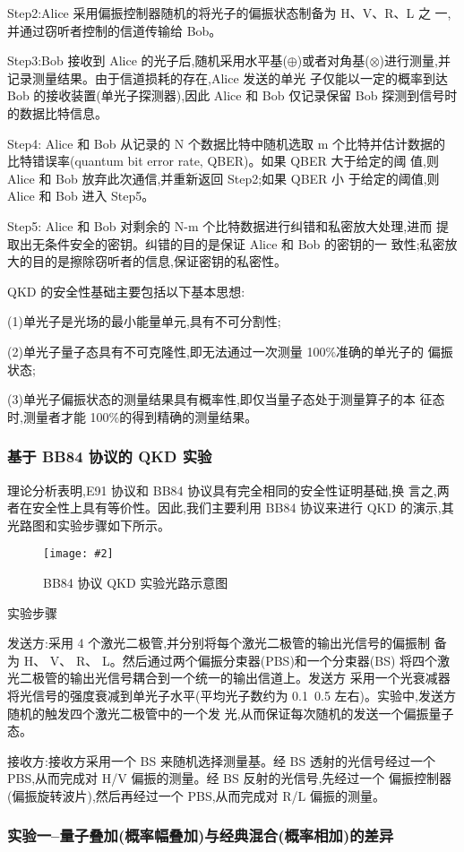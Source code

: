 \documentclass[11pt,a4paper]{ctexart}
\newcommand{\cpic}[2]{
\begin{center}
\texttt{[image: \#2]}
\end{center}
}
\newcommand{\cpicn}[3]
{
\begin{figure}[H]
\cpic{#1}{#2}
\caption{\color{red}#3\label{#2}}
\end{figure}
}
\begin{document}
Step2:Alice 采用偏振控制器随机的将光子的偏振状态制备为 H、V、R、L 之
一,并通过窃听者控制的信道传输给 Bob。

Step3:Bob 接收到 Alice 的光子后,随机采用水平基($\oplus$)或者对角基($\otimes$)进行测量,并记录测量结果。由于信道损耗的存在,Alice 发送的单光
子仅能以一定的概率到达 Bob 的接收装置(单光子探测器),因此 Alice
和 Bob 仅记录保留 Bob 探测到信号时的数据比特信息。

Step4: Alice 和 Bob 从记录的 N 个数据比特中随机选取 m 个比特并估计数据的
比特错误率(quantum bit error rate, QBER)。如果 QBER 大于给定的阈
值,则 Alice 和 Bob 放弃此次通信,并重新返回 Step2;如果 QBER 小
于给定的阈值,则 Alice 和 Bob 进入 Step5。

Step5: Alice 和 Bob 对剩余的 N-m 个比特数据进行纠错和私密放大处理,进而
提取出无条件安全的密钥。纠错的目的是保证 Alice 和 Bob 的密钥的一
致性;私密放大的目的是擦除窃听者的信息,保证密钥的私密性。

QKD 的安全性基础主要包括以下基本思想:

(1)单光子是光场的最小能量单元,具有不可分割性;

(2)单光子量子态具有不可克隆性,即无法通过一次测量 100\%准确的单光子的
偏振状态;

(3)单光子偏振状态的测量结果具有概率性,即仅当量子态处于测量算子的本
征态时,测量者才能 100\%的得到精确的测量结果。
\subsubsection{基于 BB84 协议的 QKD 实验}
理论分析表明,E91 协议和 BB84 协议具有完全相同的安全性证明基础,换
言之,两者在安全性上具有等价性。因此,我们主要利用 BB84 协议来进行 QKD
的演示,其光路图和实验步骤如下所示。
\cpicn{0.3}{BB84-optical}{BB84 协议 QKD 实验光路示意图}

实验步骤

发送方:采用 4 个激光二极管,并分别将每个激光二极管的输出光信号的偏振制
备为 H、 V、 R、 L。然后通过两个偏振分束器(PBS)和一个分束器(BS)
将四个激光二极管的输出光信号耦合到一个统一的输出信道上。发送方
采用一个光衰减器将光信号的强度衰减到单光子水平(平均光子数约为
0.1~0.5 左右)。实验中,发送方随机的触发四个激光二极管中的一个发
光,从而保证每次随机的发送一个偏振量子态。

接收方:接收方采用一个 BS 来随机选择测量基。经 BS 透射的光信号经过一个
PBS,从而完成对 H/V 偏振的测量。经 BS 反射的光信号,先经过一个
偏振控制器(偏振旋转波片),然后再经过一个 PBS,从而完成对 R/L
偏振的测量。

\subsubsection{实验一--量子叠加(概率幅叠加)与经典混合(概率相加)的差异}
\end{document}
